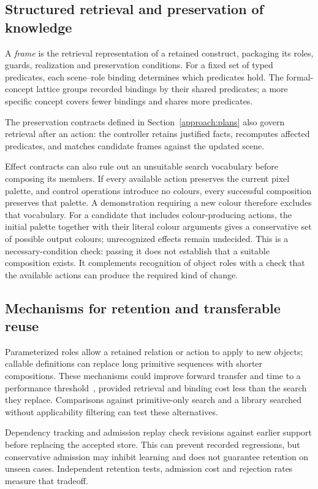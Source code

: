 \documentclass[11pt]{article}
\begin{document}
\subsection{Structured retrieval and preservation of knowledge}\label{approach:retrieval}
A \emph{frame} is the retrieval representation of a retained construct, packaging its roles, guards, realization and preservation conditions. For a fixed set of typed predicates, each scene--role binding determines which predicates hold. The formal-concept lattice groups recorded bindings by their shared predicates; a more specific concept covers fewer bindings and shares more predicates.

The preservation contracts defined in Section~\ref{approach:plans} also govern retrieval after an action: the controller retains justified facts, recomputes affected predicates, and matches candidate frames against the updated scene.

Effect contracts can also rule out an unsuitable search vocabulary before composing its members. If every available action preserves the current pixel palette, and control operations introduce no colours, every successful composition preserves that palette. A demonstration requiring a new colour therefore excludes that vocabulary. For a candidate that includes colour-producing actions, the initial palette together with their literal colour arguments gives a conservative set of possible output colours; unrecognized effects remain undecided. This is a necessary-condition check: passing it does not establish that a suitable composition exists. It complements recognition of object roles with a check that the available actions can produce the required kind of change.

\subsection{Mechanisms for retention and transferable reuse}\label{approach:reuse}
Parameterized roles allow a retained relation or action to apply to new objects; callable definitions can replace long primitive sequences with shorter compositions. These mechanisms could improve forward transfer and time to a performance threshold~\cite{gem,transfer}, provided retrieval and binding cost less than the search they replace. Comparisons against primitive-only search and a library searched without applicability filtering can test these alternatives.

Dependency tracking and admission replay check revisions against earlier support before replacing the accepted store. This can prevent recorded regressions, but conservative admission may inhibit learning and does not guarantee retention on unseen cases. Independent retention tests, admission cost and rejection rates measure that tradeoff.
\end{document}
